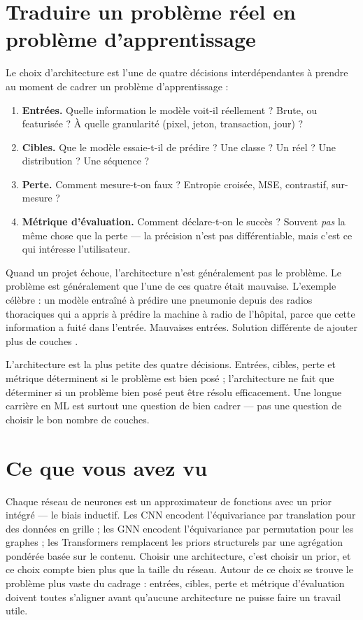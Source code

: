 \section{Traduire un problème réel en problème d'apprentissage}

Le choix d'architecture est l'une de quatre décisions interdépendantes à prendre au moment de cadrer un problème d'apprentissage :

\begin{enumerate}
  \item \textbf{Entrées.} Quelle information le modèle voit-il réellement ? Brute, ou featurisée ? À quelle granularité (pixel, jeton, transaction, jour) ?
  \item \textbf{Cibles.} Que le modèle essaie-t-il de prédire ? Une classe ? Un réel ? Une distribution ? Une séquence ?
  \item \textbf{Perte.} Comment mesure-t-on \og faux \fg ? Entropie croisée, MSE, contrastif, sur-mesure ?
  \item \textbf{Métrique d'évaluation.} Comment déclare-t-on le succès ? Souvent \emph{pas} la même chose que la perte --- la précision n'est pas différentiable, mais c'est ce qui intéresse l'utilisateur.
\end{enumerate}

Quand un projet échoue, l'architecture n'est généralement pas le problème. Le problème est généralement que l'une de ces quatre était mauvaise. L'exemple célèbre : un modèle entraîné à prédire une pneumonie depuis des radios thoraciques qui a appris à prédire la machine à radio de l'hôpital, parce que cette information a fuité dans l'entrée. Mauvaises entrées. Solution différente de \og ajouter plus de couches \fg.

\begin{intuition}
L'architecture est la plus petite des quatre décisions. Entrées, cibles, perte et métrique déterminent si le problème est bien posé ; l'architecture ne fait que déterminer si un problème bien posé peut être résolu efficacement. Une longue carrière en ML est surtout une question de bien cadrer --- pas une question de choisir le bon nombre de couches.
\end{intuition}

\section{Ce que vous avez vu}

Chaque réseau de neurones est un approximateur de fonctions avec un prior intégré --- le biais inductif. Les CNN encodent l'équivariance par translation pour des données en grille ; les GNN encodent l'équivariance par permutation pour les graphes ; les Transformers remplacent les priors structurels par une agrégation pondérée basée sur le contenu. Choisir une architecture, c'est choisir un prior, et ce choix compte bien plus que la taille du réseau. Autour de ce choix se trouve le problème plus vaste du cadrage : entrées, cibles, perte et métrique d'évaluation doivent toutes s'aligner avant qu'aucune architecture ne puisse faire un travail utile.


